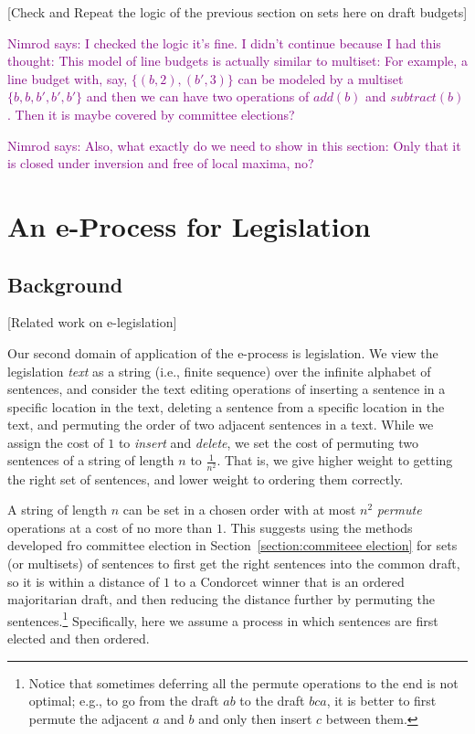 \documentclass{llncs}
\newcommand{\nimrod}[1]{\textcolor{purple}{Nimrod says: #1}}
\begin{document}
[Check and Repeat the logic of the previous section on sets here on draft budgets]

\nimrod{I checked the logic it's fine. I didn't continue because I had this thought: This model of line budgets is actually similar to multiset: For example, a line budget with, say, $\{(b, 2), (b', 3)\}$ can be modeled by a multiset $\{b, b, b', b', b'\}$ and then we can have two operations of $add(b)$ and $subtract(b)$. Then it is maybe covered by committee elections?}

\nimrod{Also, what exactly do we need to show in this section: Only that it is closed under inversion and free of local maxima, no?}


\section{An e-Process for Legislation}
\label{section:e-process legislation}

\subsection{Background}

[Related work on e-legislation]

Our second domain of application of the e-process is legislation.
We view the legislation \emph{text} as a string (i.e., finite sequence) over the infinite alphabet of sentences, and consider the text editing operations of inserting a sentence in a specific location in the text, deleting a sentence from a specific location in the text, and permuting the order of two adjacent sentences in a text. While we assign the cost of $1$ to \emph{insert} and \emph{delete}, we set the cost of permuting two sentences of a string of length $n$ to $\frac{1}{n^2}$.  That is, we give higher weight to getting the right set of sentences, and lower weight to ordering them correctly. 

A string of length $n$ can be set in a chosen order with at most ${n^2}$ \emph{permute} operations at a cost of no more than $1$. This suggests using the methods developed fro committee election in Section~\ref{section:commiteee election} for sets (or multisets) of sentences to first get the right sentences into the common draft, so it is within a distance of $1$ to a Condorcet winner that is an ordered majoritarian draft, and then reducing the distance further by permuting the sentences.\footnote{
Notice that sometimes deferring all the permute operations to the end is not optimal; e.g., to go from the draft $ab$ to the draft $bca$, it is better to first permute the adjacent $a$ and $b$ and only then insert $c$ between them.} Specifically, here we assume a process in which sentences are first elected and then ordered.
\end{document}
